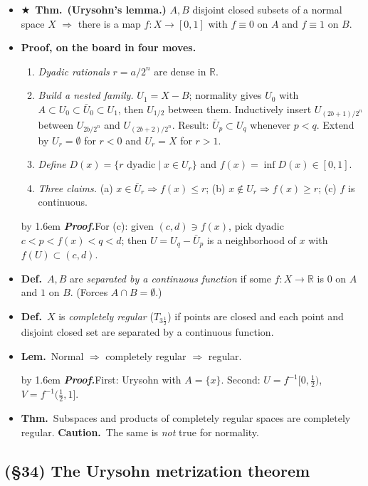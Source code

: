 \documentclass[12pt,a4paper]{article}
\newcommand{\Dfn}{\textbf{Def.}~}
\newcommand{\Thm}{\textbf{Thm.}~}
\newcommand{\Lem}{\textbf{Lem.}~}
\newcommand{\Warn}{\textbf{Caution.}~}
\newcommand{\Key}{$\bigstar$~}                  %
\newcommand{\Pf}[1]{%
  \par\addvspace{7pt}\nopagebreak
  \begingroup
    \advance\leftskip by 1.6em
    \parindent=0pt \small\color{prf}%
    \textbf{\textit{Proof.}}\enspace #1\par
  \endgroup
  \addvspace{9pt}}
\newenvironment{BL}%
  {\begin{itemize}[leftmargin=1.4em,labelsep=0.55em,itemsep=11pt,topsep=11pt,parsep=0pt]}%
  {\end{itemize}}
\newenvironment{NL}%
  {\begin{enumerate}[label=(\arabic*),leftmargin=2em,labelsep=0.45em,itemsep=6pt,topsep=7pt,parsep=0pt]}%
  {\end{enumerate}}
\newcommand{\RR}{\mathbb{R}}
\newcommand{\imp}{\Rightarrow}
\begin{document}
\begin{BL}
\item \Key\Thm \textbf{(Urysohn's lemma.)} $A,B$ disjoint closed subsets of a normal space $X$
      $\imp$ there is a map $f\colon X\to[0,1]$ with $f\equiv0$ on $A$ and $f\equiv1$ on $B$.
\item \textbf{Proof, on the board in four moves.}
  \begin{NL}
  \item \emph{Dyadic rationals} $r=a/2^n$ are dense in $\RR$.
  \item \emph{Build a nested family.} $U_1=X-B$; normality gives $U_0$ with
        $A\subset U_0\subset\bar U_0\subset U_1$, then $U_{1/2}$ between them.
        Inductively insert $U_{(2b+1)/2^n}$ between $U_{2b/2^n}$ and $U_{(2b+2)/2^n}$.
        Result: $\bar U_p\subset U_q$ whenever $p<q$.
        Extend by $U_r=\emptyset$ for $r<0$ and $U_r=X$ for $r>1$.
  \item \emph{Define} $D(x)=\{r\text{ dyadic}\mid x\in U_r\}$ and
        \(f(x)=\inf D(x)\in[0,1].\)
  \item \emph{Three claims.}
        (a) $x\in\bar U_r\imp f(x)\le r$;\;
        (b) $x\notin U_r\imp f(x)\ge r$;\;
        (c) $f$ is continuous.
  \end{NL}
\Pf{For (c): given $(c,d)\ni f(x)$, pick dyadic $c<p<f(x)<q<d$; then
$U=U_q-\bar U_p$ is a neighborhood of $x$ with $f(U)\subset(c,d)$.}
\item \Dfn $A,B$ are \emph{separated by a continuous function} if some $f\colon X\to\RR$
      is $0$ on $A$ and $1$ on $B$. (Forces $A\cap B=\emptyset$.)
\item \Dfn $X$ is \emph{completely regular} ($T_{3\frac12}$) if points are closed and each
      point and disjoint closed set are separated by a continuous function.
\item \Lem Normal $\imp$ completely regular $\imp$ regular.
\Pf{First: Urysohn with $A=\{x\}$.
Second: $U=f^{-1}[0,\tfrac12)$, $V=f^{-1}(\tfrac12,1]$.}
\item \Thm Subspaces and products of completely regular spaces are completely regular.
      \Warn The same is \emph{not} true for normality.
\end{BL}

\subsection{(\S34) The Urysohn metrization theorem}
\end{document}
